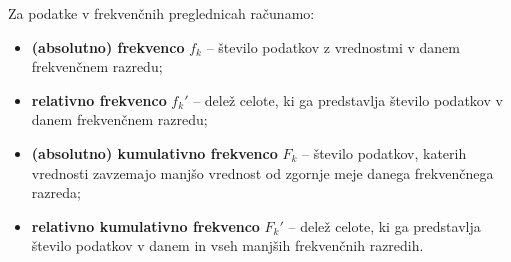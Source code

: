             
                Za podatke v frekvenčnih preglednicah računamo:
                \begin{itemize}
                    \item \textbf{(absolutno) frekvenco} $f_k$ -- število podatkov z vrednostmi v danem frekvenčnem razredu;
                    \item \textbf{relativno frekvenco} $f_k'$ -- delež celote, ki ga predstavlja število podatkov v danem frekvenčnem razredu;
                    \item \textbf{(absolutno) kumulativno frekvenco} $F_k$ -- število podatkov, katerih vrednosti zavzemajo manjšo vrednost od zgornje meje danega frekvenčnega razreda;
                    \item \textbf{relativno kumulativno frekvenco} $F_k'$ -- delež celote, ki ga predstavlja število podatkov v danem in vseh manjših frekvenčnih razredih.
                \end{itemize}
            
        
                ~\\~


        
